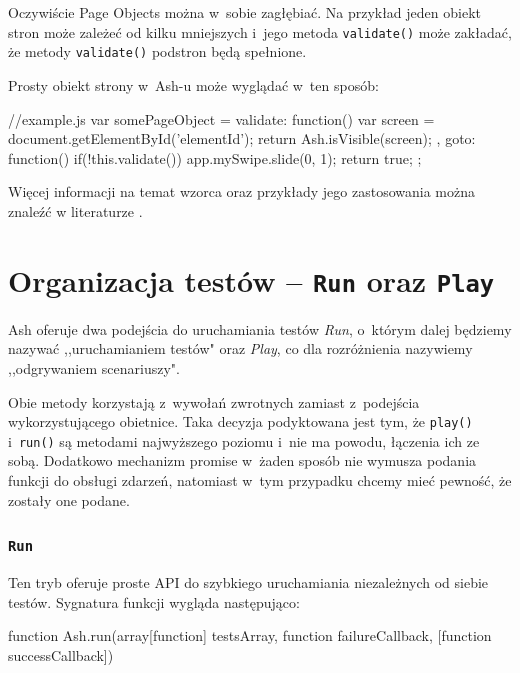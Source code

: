 \documentclass{xmgr}
\begin{document}
Oczywiście Page Objects można w~sobie zagłębiać. Na przykład jeden obiekt stron może zależeć od kilku mniejszych i~jego metoda \texttt{validate()} może zakładać, że metody \texttt{validate()} podstron będą spełnione. 

Prosty obiekt strony w~Ash-u może wyglądać w~ten sposób:

\begin{javascriptcode}
    //example.js
    var somePageObject = {
    	validate: function(){
      	    var screen = document.getElementById('elementId');
             return Ash.isVisible(screen);
          },
         goto: function(){
             if(!this.validate()) app.mySwipe.slide(0, 1);
             return true;
         }
    };
\end{javascriptcode}

Więcej informacji na temat wzorca oraz przykłady jego zastosowania można znaleźć w literaturze \cite{Selenium}.

\section{Organizacja testów -- \texttt{Run} oraz \texttt{Play}}

Ash oferuje dwa podejścia do uruchamiania testów \textit{Run}, o~którym dalej będziemy nazywać ,,uruchamianiem testów" oraz \textit{Play}, co dla rozróżnienia nazywiemy ,,odgrywaniem scenariuszy".

Obie metody korzystają z~wywołań zwrotnych zamiast z~podejścia wykorzystującego obietnice. Taka decyzja podyktowana jest tym, że \texttt{play()} i~\texttt{run()} są metodami najwyższego poziomu i~nie ma powodu, łączenia ich ze sobą. Dodatkowo mechanizm promise w~żaden sposób nie wymusza podania funkcji do obsługi zdarzeń, natomiast w~tym przypadku chcemy mieć pewność, że zostały one podane.  

\subsubsection{\texttt{Run} }

Ten tryb oferuje proste API do szybkiego uruchamiania niezależnych od siebie testów. Sygnatura funkcji wygląda następująco: 

\begin{javascriptcode}
  function Ash.run(array[function] testsArray, 
                   function failureCallback, 
                   [function successCallback]) 
\end{javascriptcode}
\end{document}
